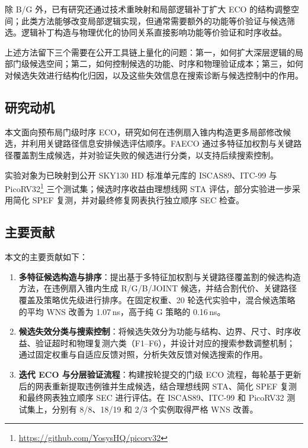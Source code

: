 \documentclass[twocolumn,10pt,fontset=windows]{ctexart}
\begin{document}
除 B/G 外，已有研究还通过技术重映射和局部逻辑补丁扩大 ECO 的结构调整空间；此类方法能够改变局部逻辑实现，但通常需要额外的功能等价验证与候选筛选。逻辑补丁构造与物理优化的协同关系直接影响功能等价验证和时序收益。

上述方法留下三个需要在公开工具链上量化的问题：第一，如何扩大深层逻辑的局部门级候选空间；第二，如何控制候选的功能、时序和物理验证成本；第三，如何对候选失效进行结构化归因，以及这些失效信息在搜索诊断与候选控制中的作用。
\subsection{研究动机}
本文面向预布局门级时序 ECO，研究如何在违例扇入锥内构造更多局部修改候选，并利用关键路径信息安排候选评估顺序。FAECO 通过多特征加权割与关键路径覆盖割生成候选，并对验证失败的候选进行分类，以支持后续搜索控制。

实验对象为已映射到公开 SKY130 HD 标准单元库的 ISCAS89\cite{iscas89}、ITC-99\cite{itc99} 与 PicoRV32\footnote{\url{https://github.com/YosysHQ/picorv32}} 三个测试集；候选时序收益由理想线网 STA 评估，部分实验进一步采用简化 SPEF 复测，并对最终修复网表执行独立顺序 SEC 检查。

\subsection{主要贡献}
本文的主要贡献如下：

\begin{enumerate}
  \item \textbf{多特征候选构造与排序}：提出基于多特征加权割与关键路径覆盖割的候选构造方法，在违例扇入锥内生成 R/G/B/JOINT 候选，并结合割代价、关键路径覆盖及策略优先级进行排序。在固定权重、20 轮迭代实验中，混合候选策略的平均 WNS 改善为 1.07\,ns，高于纯 G 策略的 0.16\,ns。
  \item \textbf{候选失效分类与搜索控制}：将候选失效分为功能与结构、边界、尺寸、时序收益、验证超时和物理复测六类（F1--F6），并设计对应的搜索参数调整机制；通过固定权重与自适应反馈对照，分析失效反馈对候选搜索的作用。
  \item \textbf{迭代 ECO 与分层验证流程}：构建按轮提交的门级 ECO 流程，每轮基于更新后的网表重新提取违例锥并生成候选，结合理想线网 STA、简化 SPEF 复测和最终网表独立顺序 SEC 进行评估。在 ISCAS89、ITC-99 和 PicoRV32 测试集上，分别有 8/8、18/19 和 2/3 个实例取得严格 WNS 改善。
\end{enumerate}

\end{document}
